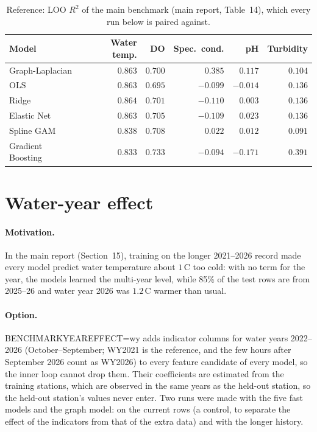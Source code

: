 \documentclass[11pt]{article}
\newcommand{\codeus}{\textunderscore\allowbreak}
\newcommand{\code}[1]{{\ttfamily\let\_\codeus #1}}
\begin{document}
\begin{table}[h]
\centering
\small
\caption{Reference: LOO $R^2$ of the main benchmark (main report, Table~14), which every run below is
paired against.}
\label{tab:base}
\begin{tabular}{l rrrrr}
\toprule
Model & Water temp. & DO & Spec.\ cond. & pH & Turbidity \\
\midrule
Graph-Laplacian   & $0.863$ & $0.700$ & $0.385$ & $0.117$ & $0.104$ \\
OLS               & $0.863$ & $0.695$ & $-0.099$ & $-0.014$ & $0.136$ \\
Ridge             & $0.864$ & $0.701$ & $-0.110$ & $0.003$ & $0.136$ \\
Elastic Net       & $0.863$ & $0.705$ & $-0.109$ & $0.023$ & $0.136$ \\
Spline GAM        & $0.838$ & $0.708$ & $0.022$ & $0.012$ & $0.091$ \\
Gradient Boosting & $0.833$ & $0.733$ & $-0.094$ & $-0.171$ & $0.391$ \\
\bottomrule
\end{tabular}
\end{table}

\section{Water-year effect}\label{sec:wy}

\paragraph{Motivation.} In the main report (Section~15), training on the longer 2021--2026 record
made every model predict water temperature about $1$\,\textdegree C too cold: with no term for the
year, the models learned the multi-year level, while 85\% of the test rows are from 2025--26 and
water year 2026 was $1.2$\,\textdegree C warmer than usual.

\paragraph{Option.} \code{BENCHMARK\_YEAR\_EFFECT=wy} adds indicator columns for water years
2022--2026 (October--September; WY2021 is the reference, and the few hours after September 2026 count
as WY2026) to every feature candidate of every model, so the inner loop cannot drop them. Their
coefficients are estimated from the training stations, which are observed in the same years as the
held-out station, so the held-out station's values never enter. Two runs were made with the five
fast models and the graph model: on the current rows (a control, to separate the effect of the
indicators from that of the extra data) and with the longer history.
\end{document}

